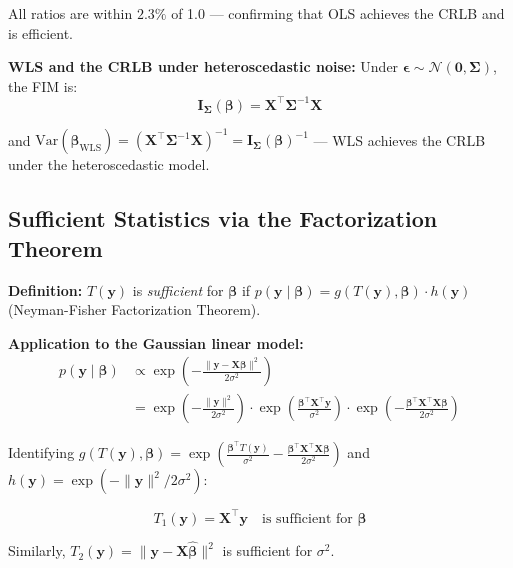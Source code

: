 \documentclass[12pt,a4paper]{article}
\begin{document}
All ratios are within $2.3\%$ of 1.0 --- confirming that OLS achieves the CRLB
and is efficient.

\textbf{WLS and the CRLB under heteroscedastic noise:}
Under $\boldsymbol{\epsilon} \sim \mathcal{N}(\mathbf{0}, \boldsymbol{\Sigma})$, the FIM is:
\begin{equation}
    \mathbf{I}_{\boldsymbol{\Sigma}}(\boldsymbol{\beta}) = \mathbf{X}^\top\boldsymbol{\Sigma}^{-1}\mathbf{X}
\end{equation}

and $\mathrm{Var}(\hat{\boldsymbol{\beta}}_{\mathrm{WLS}}) = (\mathbf{X}^\top\boldsymbol{\Sigma}^{-1}\mathbf{X})^{-1}
= \mathbf{I}_{\boldsymbol{\Sigma}}(\boldsymbol{\beta})^{-1}$ --- WLS achieves the CRLB
under the heteroscedastic model.

\subsection*{Sufficient Statistics via the Factorization Theorem}

\textbf{Definition:} $T(\mathbf{y})$ is \emph{sufficient} for $\boldsymbol{\beta}$ if
$p(\mathbf{y} \mid \boldsymbol{\beta}) = g(T(\mathbf{y}), \boldsymbol{\beta})\cdot h(\mathbf{y})$
(Neyman-Fisher Factorization Theorem).

\textbf{Application to the Gaussian linear model:}
\begin{align}
    p(\mathbf{y} \mid \boldsymbol{\beta})
    &\propto \exp\!\left(-\frac{\|\mathbf{y} - \mathbf{X}\boldsymbol{\beta}\|^2}{2\sigma^2}\right) \nonumber \\
    &= \exp\!\left(-\frac{\|\mathbf{y}\|^2}{2\sigma^2}\right)
       \cdot\exp\!\left(\frac{\boldsymbol{\beta}^\top\mathbf{X}^\top\mathbf{y}}{\sigma^2}\right)
       \cdot\exp\!\left(-\frac{\boldsymbol{\beta}^\top\mathbf{X}^\top\mathbf{X}\boldsymbol{\beta}}{2\sigma^2}\right)
\end{align}

Identifying $g(T(\mathbf{y}), \boldsymbol{\beta}) = \exp\!\left(\frac{\boldsymbol{\beta}^\top T(\mathbf{y})}{\sigma^2} - \frac{\boldsymbol{\beta}^\top\mathbf{X}^\top\mathbf{X}\boldsymbol{\beta}}{2\sigma^2}\right)$
and $h(\mathbf{y}) = \exp(-\|\mathbf{y}\|^2/2\sigma^2)$:

\begin{equation}
    \boxed{T_1(\mathbf{y}) = \mathbf{X}^\top\mathbf{y} \quad\text{is sufficient for } \boldsymbol{\beta}}
\end{equation}

Similarly, $T_2(\mathbf{y}) = \|\mathbf{y} - \mathbf{X}\hat{\boldsymbol{\beta}}\|^2$ is sufficient for $\sigma^2$.
\end{document}
